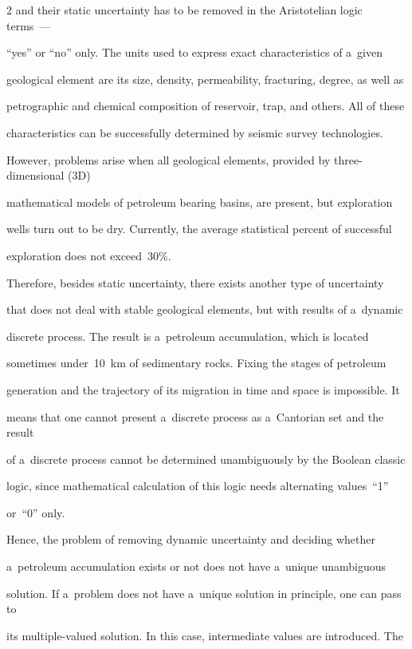 \begin{multicols}{2}
and their static uncertainty has to be removed in the Aristotelian logic terms~--- 

``yes'' or ``no'' only. The units used to express exact characteristics of a~given 

geological element are its size, density, permeability, fracturing, degree, as well as 

petrographic and chemical composition of reservoir, trap, and others. All of these 

characteristics can be successfully determined by seismic survey technologies. 

However, problems arise when all geological elements, provided by three-dimensional (3D) 

mathematical models of petroleum bearing basins, are present, but exploration 

wells turn out to be dry. Currently, the average statistical percent of successful 

exploration does not exceed~30\%. 

     

     Therefore, besides static uncertainty, there exists another type of uncertainty 

that does not deal with stable geological elements, but with results of a~dynamic 

discrete process. The result is a~petroleum accumulation, which is located 

sometimes under~10~km of sedimentary rocks. Fixing the stages of petroleum 

generation and the trajectory of its migration in time and space is impossible. It 

means that one cannot present a~discrete process as a~Cantorian set and the result 

of a~discrete process cannot be determined unambiguously by the Boolean classic 

logic, since mathematical calculation of this logic needs alternating values~``1'' 

or~``0'' only. 

     

     Hence, the problem of removing dynamic uncertainty and deciding whether 

a~petroleum accumulation exists or not does not have a~unique unambiguous 

solution. If a~problem does not have a~unique solution in principle, one can pass to 

its multiple-valued solution. In this case, intermediate values are introduced. The 


\end{multicols}
